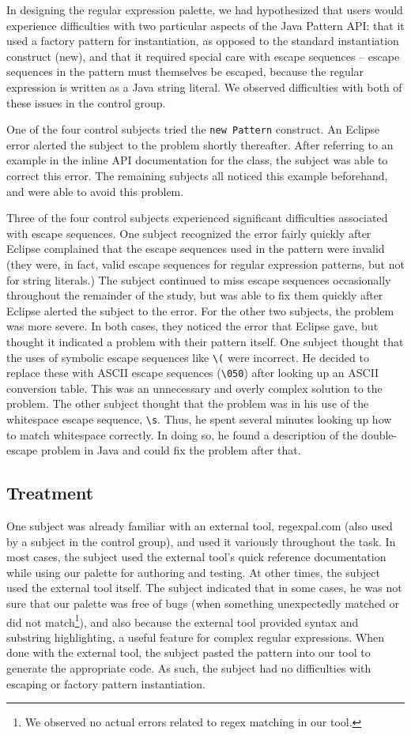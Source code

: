 \documentclass[10pt, conference, compsocconf]{IEEEtran}
\begin{document}
In designing the regular expression palette, we had hypothesized that users would experience difficulties with two particular aspects of the Java Pattern API: that it used a factory pattern for instantiation, as opposed to the standard instantiation construct (new), and that it required special care with escape sequences -- escape sequences in the pattern must themselves be escaped, because the regular expression is written as a Java string literal. We observed difficulties with both of these issues in the control group. 

One of the four control subjects tried the \verb|new Pattern| construct. An Eclipse error alerted the subject to the problem shortly thereafter. After referring to an example in the inline API documentation for the class, the subject was able to correct this error. The remaining subjects all noticed this example beforehand, and were able to avoid this problem.

Three of the four control subjects experienced significant difficulties associated with escape sequences. One subject recognized the error fairly quickly after Eclipse complained that the escape sequences used in the pattern were invalid (they were, in fact, valid escape sequences for regular expression patterns, but not for string literals.) The subject continued to miss escape sequences occasionally throughout the remainder of the study, but was able to fix them quickly after Eclipse alerted the subject to the error. For the other two subjects, the problem was more severe. In both cases, they noticed the error that Eclipse gave, but thought it indicated a problem with their pattern itself. One subject thought that the uses of symbolic escape sequences like \verb|\(| were incorrect. He decided to replace these with ASCII escape sequences (\verb|\050|) after looking up an ASCII conversion table. This was an unnecessary and overly complex solution to the problem. The other subject thought that the problem was in his use of the whitespace escape sequence, \verb|\s|. Thus, he  spent several minutes looking up how to match whitespace correctly. In doing so, he found a description of the double-escape problem in Java and could fix the problem after that.
\subsection{Treatment}
One subject was already familiar with an external tool, regexpal.com (also used by a subject in the control group), and used it variously throughout the task. In most cases, the subject used the external tool's quick reference documentation while using our palette for authoring and testing. At other times, the subject used the external tool itself. The subject indicated that in some cases, he was not sure that our palette was free of bugs (when something unexpectedly matched or did not match\footnote{We observed no actual errors related to regex matching in our tool.}), and also because the external tool provided syntax and substring highlighting, a useful feature for complex regular expressions. When done with the external tool, the subject pasted the pattern into our tool to generate the appropriate code. As such, the subject had no difficulties with escaping or factory pattern instantiation.
\end{document}
